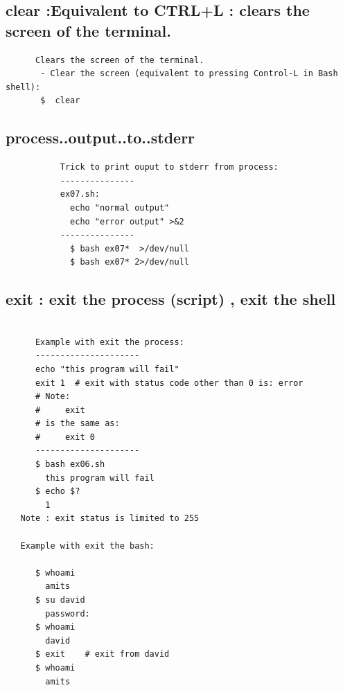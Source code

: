 \documentclass[a4paper,12pt]{article}
\begin{document}
\subsection{clear :Equivalent to CTRL+L : clears the screen of the terminal. }
\begin{verbatim}
      Clears the screen of the terminal.
       - Clear the screen (equivalent to pressing Control-L in Bash shell):
       $  clear
\end{verbatim}


\subsection{process..output..to..stderr }
\begin{verbatim}
           Trick to print ouput to stderr from process:
           ---------------
           ex07.sh:
             echo "normal output"
             echo "error output" >&2            
           --------------- 
             $ bash ex07*  >/dev/null
             $ bash ex07* 2>/dev/null 

\end{verbatim}


\subsection{exit   : exit the process (script) , exit the shell}
\begin{verbatim}

      Example with exit the process:
      ---------------------
      echo "this program will fail"
      exit 1  # exit with status code other than 0 is: error
      # Note:
      #     exit 
      # is the same as:
      #     exit 0     
      ---------------------
      $ bash ex06.sh
        this program will fail
      $ echo $?
        1
   Note : exit status is limited to 255
   
   Example with exit the bash:
      
      $ whoami
        amits
      $ su david
        password:
      $ whoami
        david 
      $ exit    # exit from david
      $ whoami
        amits   
\end{verbatim}
\end{document}
